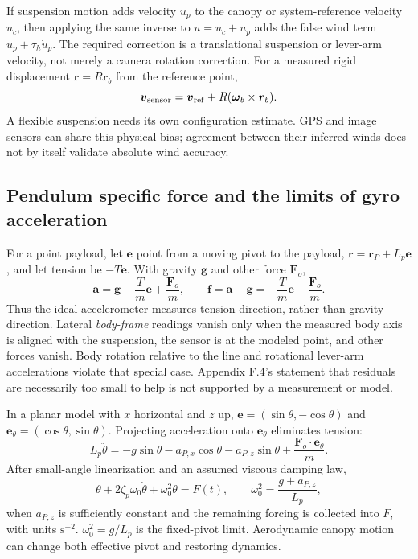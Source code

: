 \documentclass[11pt,a4paper]{article}
\numberwithin{equation}{section}
\begin{document}
If suspension motion adds velocity $u_p$ to the canopy or system-reference
velocity $u_c$, then applying the same inverse to $u=u_c+u_p$ adds
the false wind term $u_p+\tau_h\dot u_p$.
The required correction is a translational suspension or lever-arm velocity,
not merely a camera rotation correction. For a measured rigid displacement
$\boldsymbol r=R\boldsymbol r_b$ from the reference point,
\begin{equation}
 \boldsymbol v_{\rm sensor}=\boldsymbol v_{\mathrm{ref}}
                  +R(\boldsymbol\omega_b\times\boldsymbol r_b).
\end{equation}
A flexible suspension needs its own configuration estimate. GPS and image
sensors can share this physical bias; agreement between their inferred winds
does not by itself validate absolute wind accuracy.

\subsection{Pendulum specific force and the limits of gyro acceleration}

For a point payload, let $\boldsymbol e$ point from a moving pivot to the
payload, $\boldsymbol r=\boldsymbol r_P+L_p\boldsymbol e$, and let tension
be $-T\boldsymbol e$. With gravity $\boldsymbol g$ and other force
$\boldsymbol F_o$,
\begin{equation}
 \boldsymbol a=\boldsymbol g-\frac{T}{m}\boldsymbol e
                         +\frac{\boldsymbol F_o}{m},\qquad
 \boldsymbol f=\boldsymbol a-\boldsymbol g
             =-\frac{T}{m}\boldsymbol e+\frac{\boldsymbol F_o}{m}.
\end{equation}
Thus the ideal accelerometer measures tension direction, rather than gravity
direction. Lateral \emph{body-frame} readings vanish only when the measured
body axis is aligned with the suspension, the sensor is at the modeled
point, and other forces vanish. Body rotation relative to the line and
rotational lever-arm accelerations violate that special case. Appendix
F.4's statement that residuals are necessarily too small to help is not
supported by a measurement or model.

In a planar model with $x$ horizontal and $z$ up,
$\boldsymbol e=(\sin\theta,-\cos\theta)$ and
$\boldsymbol e_\theta=(\cos\theta,\sin\theta)$.
Projecting acceleration onto $\boldsymbol e_\theta$ eliminates tension:
\begin{equation}
 L_p\ddot\theta=-g\sin\theta
 -a_{P,x}\cos\theta-a_{P,z}\sin\theta
 +\frac{\boldsymbol F_o\cdot\boldsymbol e_\theta}{m}.
\end{equation}
After small-angle linearization and an assumed viscous damping law,
\begin{equation}
 \ddot\theta+2\zeta_p\omega_0\dot\theta+\omega_0^2\theta=F(t),
 \qquad \omega_0^2=\frac{g+a_{P,z}}{L_p},
\end{equation}
when $a_{P,z}$ is sufficiently constant and the remaining forcing is
collected into $F$, with units $\mathrm{s^{-2}}$.
$\omega_0^2=g/L_p$ is the fixed-pivot limit. Aerodynamic canopy motion can
change both effective pivot and restoring dynamics.
\end{document}

